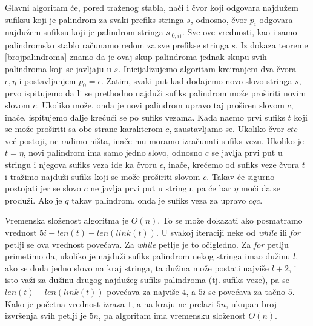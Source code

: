 Glavni algoritam \' ce, pored tra\v zenog stabla, na\' ci i \v cvor koji odgovara najdu\v zem sufiksu koji je palindrom za svaki prefiks stringa $s$, odnosno, \v cvor $p_i$ odgovara najdu\v zem sufiksu koji je palindrom stringa $s_{[0,i)}$. Sve ove vrednosti, kao i samo palindromsko stablo ra\v cunamo redom za sve prefikse stringa $s$. Iz dokaza teoreme \ref{brojpalindroma} znamo da je ovaj skup palindroma jednak skupu svih palindroma koji se javljaju u $s$. Inicijalizujemo algoritam kreiranjem dva \v cvora $\epsilon, \eta$ i postavljanjem $p_0 = \epsilon$. Zatim, svaki put kad dodajemo novo slovo stringa $s$, prvo ispitujemo da li se prethodno najdu\v zi sufiks palindrom mo\v ze pro\v siriti novim slovom $c$. Ukoliko mo\v ze, onda je novi palindrom upravo taj pro\v siren slovom $c$, ina\v ce, ispitujemo dalje kre\' cu\' ci se po sufiks vezama. Kada na\dj emo prvi sufiks $t$ koji se mo\v ze pro\v siriti sa obe strane karakterom $c$, zaustavljamo se. Ukoliko \v cvor $ctc$ ve\' c postoji, ne radimo ni\v sta, ina\v ce mu moramo izra\v cunati sufiks vezu. Ukoliko je $t = \eta$, novi palindrom ima samo jedno slovo, odnosno $c$ se javlja prvi put u stringu i njegova sufiks veza ide ka \v cvoru $\epsilon$, ina\v ce, kre\' cemo od sufiks veze \v cvora $t$ i tra\v zimo najdu\v zi sufiks koji se mo\v ze pro\v siriti slovom $c$. Takav \' ce sigurno postojati jer se slovo $c$ ne javlja prvi put u stringu, pa \' ce bar $\eta$ mo\' ci da se produ\v zi. Ako je $q$ takav palindrom, onda je sufiks veza za upravo $cqc$.

\noindent
\begin{minipage}[l]{\textwidth}

\end{minipage}

Vremenska slo\v zenost algoritma je $O(n)$. To se mo\v ze dokazati ako posmatramo vrednost $5i-len(t)- len(link(t))$. U svakoj iteraciji neke od \textit{while} ili \textit{for} petlji se ova vrednost pove\' cava. Za \textit{while} petlje je to o\v cigledno. Za \textit{for} petlju primetimo da, ukoliko je najdu\v zi sufiks palindrom nekog stringa imao du\v zinu $l$, ako se doda jedno slovo na kraj stringa, ta du\v zina mo\v ze postati najvi\v se $l+2$, i isto va\v zi za du\v zinu drugog najdu\v zeg sufiks palindroma (tj. sufiks veze), pa se $len(t)- len(link(t))$ pove\' cava za najvi\v se $4$, a $5i$ se pove\'cava za ta\v cno $5$. Kako je po\v cetna vrednost izraza $1$, a na kraju ne prelazi $5n$, ukupan broj izvr\v senja svih petlji je $5n$, pa algoritam ima vremensku slo\v zenost $O(n)$. 

